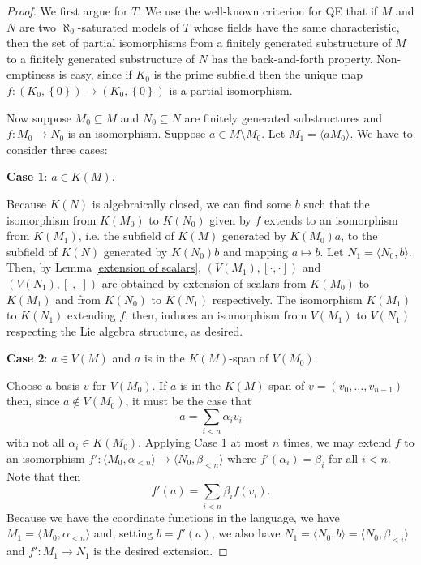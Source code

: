 \documentclass[psamsfonts]{amsart}
\theoremstyle{definition}
\theoremstyle{definition}
\theoremstyle{remark}
\numberwithin{equation}{section}
\newcommand{\set}[1]{\left\{ {#1} \right\}}
\begin{document}
\begin{proof}
We first argue for $T$.  We use the well-known criterion for QE that if $M$ and $N$ are two $\aleph_{0}$-saturated models of $T$ whose fields have the same characteristic, then the set of partial isomorphisms from a finitely generated substructure of $M$ to a finitely generated substructure of $N$ has the back-and-forth property. Non-emptiness is easy, since if $K_{0}$ is the prime subfield then the unique map $f:(K_{0},\set{0})\to (K_{0},\set{0})$ is a partial isomorphism. 

Now suppose $M_{0} \subseteq M$ and $N_{0} \subseteq N$ are finitely generated substructures and $f : M_{0} \to N_{0}$ is an isomorphism. Suppose $a \in M \setminus M_{0}$.  Let $M_{1} = \langle a M_{0} \rangle$. We have to consider three cases:

\textbf{Case 1}:  $a \in K(M)$.  

Because $K(N)$ is algebraically closed, we can find some $b$ such that the isomorphism from $K(M_{0})$ to $K(N_{0})$ given by $f$ extends to an isomorphism from $K(M_{1})$, i.e. the subfield of $K(M)$ generated by $K(M_{0})a$, to the subfield of $K(N)$ generated by $K(N_{0})b$ and mapping $a \mapsto b$.  Let $N_{1} = \langle N_{0},b \rangle$.  Then, by Lemma \ref{extension of scalars}, $(V(M_{1}), [\cdot,\cdot])$ and $(V(N_{1}), [\cdot,\cdot])$ are obtained by extension of scalars from $K(M_{0})$ to $K(M_{1})$ and from $K(N_{0})$ to $K(N_{1})$ respectively.  The isomorphism $K(M_{1})$ to $K(N_{1})$ extending $f$, then, induces an isomorphism from $V(M_{1})$ to $V(N_{1})$ respecting the Lie algebra structure, as desired. 

\textbf{Case 2}: $a \in V(M)$ and $a$ is in the $K(M)$-span of $V(M_{0})$.  

Choose a basis $\overline{v}$ for $V(M_{0})$.  If $a$ is in the $K(M)$-span of $\overline{v} = (v_{0}, \ldots, v_{n-1})$ then, since $a \not\in V(M_{0})$, it must be the case that 
$$
a = \sum_{i < n} \alpha_{i} v_{i}
$$
with not all $\alpha_{i} \in K(M_{0})$.  Applying Case 1 at most $n$ times, we may extend $f$ to an isomorphism $f': \langle M_{0}, \alpha_{<n} \rangle \to \langle N_{0}, \beta_{<n} \rangle$ where $f'(\alpha_{i}) = \beta_{i}$ for all $i < n$.  Note that then
$$
f'(a) = \sum_{i < n} \beta_{i}f(v_{i}).
$$
Because we have the coordinate functions in the language, we have $M_{1} = \langle M_{0}, \alpha_{<n}\rangle$ and, setting $b = f'(a)$, we also have $N_{1} = \langle N_{0},b \rangle = \langle N_{0}, \beta_{<i} \rangle$ and $f' :M_{1} \to N_{1}$ is the desired extension. 


\end{proof}
\end{document}
